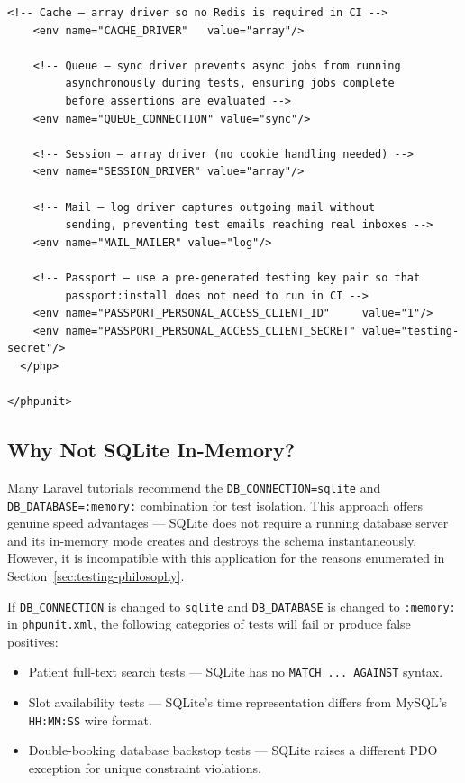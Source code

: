 \begin{lstlisting}[style=xml, caption={\texttt{phpunit.xml} --- complete
  PHPUnit 11 configuration for the Clinic Management API.}]
    <!-- Cache — array driver so no Redis is required in CI -->
    <env name="CACHE_DRIVER"   value="array"/>

    <!-- Queue — sync driver prevents async jobs from running
         asynchronously during tests, ensuring jobs complete
         before assertions are evaluated -->
    <env name="QUEUE_CONNECTION" value="sync"/>

    <!-- Session — array driver (no cookie handling needed) -->
    <env name="SESSION_DRIVER" value="array"/>

    <!-- Mail — log driver captures outgoing mail without
         sending, preventing test emails reaching real inboxes -->
    <env name="MAIL_MAILER" value="log"/>

    <!-- Passport — use a pre-generated testing key pair so that
         passport:install does not need to run in CI -->
    <env name="PASSPORT_PERSONAL_ACCESS_CLIENT_ID"     value="1"/>
    <env name="PASSPORT_PERSONAL_ACCESS_CLIENT_SECRET" value="testing-secret"/>
  </php>

</phpunit>
\end{lstlisting}

\subsection{Why Not SQLite In-Memory?}

Many Laravel tutorials recommend the \texttt{DB\_CONNECTION=sqlite} and
\texttt{DB\_DATABASE=:memory:} combination for test isolation. This
approach offers genuine speed advantages --- SQLite does not require a
running database server and its in-memory mode creates and destroys the
schema instantaneously. However, it is incompatible with this application
for the reasons enumerated in Section~\ref{sec:testing-philosophy}.

\begin{warningbox}
  If \texttt{DB\_CONNECTION} is changed to \texttt{sqlite} and
  \texttt{DB\_DATABASE} is changed to \texttt{:memory:} in
  \texttt{phpunit.xml}, the following categories of tests will fail or
  produce false positives:
  \begin{itemize}
    \item Patient full-text search tests --- SQLite has no
      \texttt{MATCH ... AGAINST} syntax.
    \item Slot availability tests --- SQLite's time representation
      differs from MySQL's \texttt{HH:MM:SS} wire format.
    \item Double-booking database backstop tests --- SQLite raises a
      different PDO exception for unique constraint violations.
  \end{itemize}
\end{warningbox}

